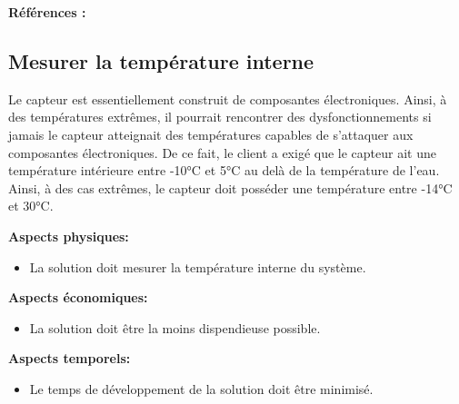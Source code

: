 \textbf{Références :} \cite{Allie} \cite{Tu1n}  \cite{Da1n}

\begin{table}[!htb]
\footnotesize
\centering
{}
\caption{Faisabilité des concepts pour mesurer la température externe}
\label{t:Decision_thermo_ext}
\end{table}


\subsection{Mesurer la température interne}
Le capteur est essentiellement construit de composantes électroniques. Ainsi, à des températures extrêmes, il pourrait rencontrer des dysfonctionnements si jamais le capteur atteignait des températures capables de s'attaquer aux composantes électroniques. De ce fait, le client a exigé que le capteur ait une température intérieure entre -10°C et 5°C au delà de la température de l'eau. Ainsi, à des cas extrêmes, le capteur doit posséder une température entre -14°C et 30°C.

\textbf{Aspects physiques:}
\begin{itemize}[label = {--}]
    \item La solution doit mesurer la température interne du système.
\end{itemize}

\textbf{Aspects économiques:}
\begin{itemize}[label = {--}]
    \item La solution doit être la moins dispendieuse possible.
\end{itemize}

\textbf{Aspects temporels:}
\begin{itemize}[label = {--}]
    \item Le temps de développement de la solution doit être minimisé.
\end{itemize}


